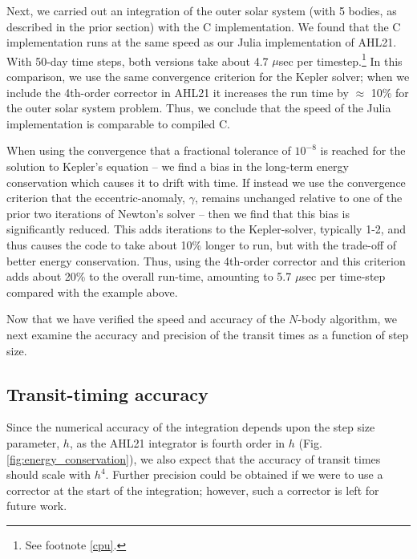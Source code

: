 \documentclass[fleqn,usenatbib,twocolumn]{mnras}
\begin{document}
Next, we carried out an integration of the outer solar system (with 5 bodies, as described in the prior section) with the C implementation.  We found that the C implementation runs at the same speed as our Julia implementation of {\sc AHL21}.  With 50-day time steps, both versions take about 4.7 $\mu$sec per timestep.\footnote{See footnote \ref{cpu}.}  In this comparison, we use the same convergence criterion for the Kepler solver; when we include the 4th-order corrector in {\sc AHL21} it increases the run time by $\approx$ 10\% for the outer solar system problem. Thus, we conclude that the speed of the Julia implementation is comparable to compiled C.

When using the convergence that a fractional tolerance of $10^{-8}$ is reached for the solution to Kepler's equation -- we find a bias in the long-term energy conservation which causes it to drift with time.  If instead we use the convergence criterion that the eccentric-anomaly, $\gamma$, remains unchanged relative to one of the prior two iterations of Newton's solver -- then we find that this bias is significantly reduced.  This adds iterations to the Kepler-solver, typically 1-2, and thus causes the code to take about 10\% longer to run, but with the trade-off of better energy conservation.  Thus, using the 4th-order corrector and this criterion adds about 20\% to the overall run-time, amounting to 5.7 $\mu$sec per time-step compared with the example above.

Now that we have verified the speed and accuracy of the $N$-body algorithm, we next examine the accuracy and precision of the transit times as a function of step size.

\subsection{Transit-timing accuracy}
\label{sec:tt_accuracy}

Since the numerical accuracy of the integration depends upon the step
size parameter, $h$, as the {\sc AHL21} integrator is fourth order
in $h$ (Fig. \ref{fig:energy_conservation}), we also expect that the accuracy of transit times should scale with $h^{4}$.
Further precision could be obtained if we were to use a corrector at the
start of the integration;  however, such a corrector is left for future work.
\end{document}
